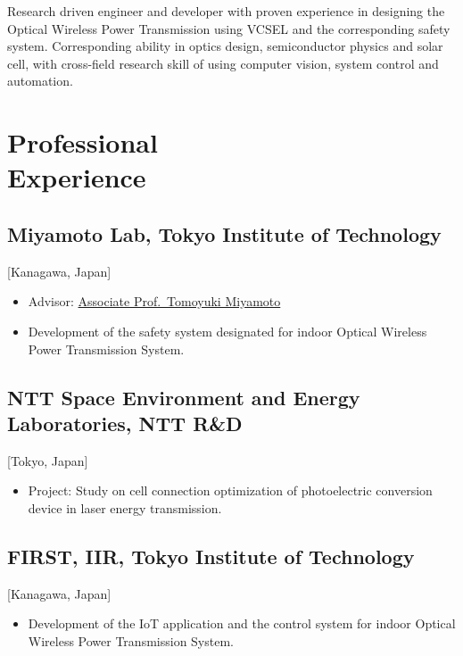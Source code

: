 \documentclass{mycv}
\begin{document}
\maketitle%

\begin{summary}
Research driven engineer and developer with proven experience in designing the Optical Wireless Power Transmission using VCSEL and the corresponding safety system. Corresponding ability in optics design, semiconductor physics and solar cell, with cross-field research skill of using computer vision, system control and automation.
\end{summary}

\section{Professional \\ Experience}

\subsection{Miyamoto Lab, Tokyo Institute of Technology}[Kanagawa, Japan]
\begin{positions}
\end{positions}
\begin{itemize}
	\item Advisor: \href{https://www.first.iir.titech.ac.jp/member/core3.html#miyamoto}{Associate Prof.~Tomoyuki Miyamoto}
	\item Development of the safety system designated for indoor Optical Wireless Power Transmission System.
\end{itemize}

\subsection{NTT Space Environment and Energy Laboratories, NTT R\&D}[Tokyo, Japan]
\begin{positions}
\end{positions}
\begin{itemize}
	\item Project: Study on cell connection optimization of photoelectric conversion device in laser energy transmission.
\end{itemize}

\subsection{FIRST, IIR, Tokyo Institute of Technology}[Kanagawa, Japan]
\begin{positions}
\end{positions}
\begin{itemize}
	\item Development of the IoT application and the control system for indoor Optical Wireless Power Transmission System. 
\end{itemize}
\end{document}
